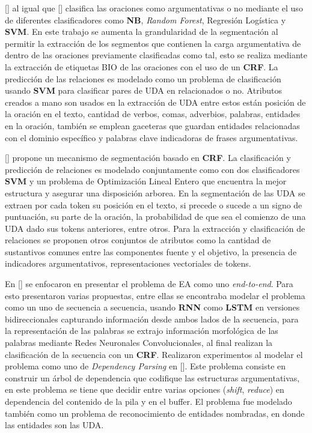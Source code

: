 [\cite{goudas2015argument}] al igual que [\cite{palau2009argumentation}] clasifica las oraciones como
argumentativas o no mediante el uso de diferentes clasificadores como \textbf{NB}, \emph{Random Forest}, Regresión
Logística y \textbf{SVM}. En este trabajo se aumenta la grandularidad de la segmentación al permitir
la extracción de los segmentos que contienen la carga argumentativa de dentro de las oraciones previamente clasificadas
como tal, esto se realiza mediante la extracción de etiquetas BIO de las oraciones con el uso de un 
\textbf{CRF}. La predicción de las relaciones es modelado como un problema de clasificación
usando \textbf{SVM} para clasificar pares de UDA en relacionados o no. Atributos creados a mano 
son usados en la extracción de UDA entre estos están posición de la oración en el texto, cantidad de verbos, comas, adverbios,
palabras, entidades en la oración, también se emplean gaceteras que guardan entidades relacionadas con el dominio 
específico y palabras clave indicadoras de frases argumentativas. 

[\cite{stab2017parsing}] propone un mecanismo de segmentación basado en \textbf{CRF}. La clasificación
y predicción de relaciones es modelado conjuntamente como con dos clasificadores \textbf{SVM} y un problema
de Optimización Lineal Entero que encuentra la mejor estructura y asegurar una disposición arborea. En la segmentación
de las UDA se extraen por cada token su posición en el texto, si precede o sucede a un signo de puntuación, su parte de
la oración, la probabilidad de que sea el comienzo de una UDA dado sus tokens anteriores, entre otros. Para la extracción
y clasificación de relaciones se proponen otros conjuntos de atributos como la cantidad de sustantivos comunes entre
las componentes fuente y el objetivo, la presencia de indicadores argumentativos, representaciones vectoriales de tokens.

En [\cite{eger2017neural}] se enfocaron en presentar el problema de EA como uno \emph{end-to-end}. 
Para esto presentaron varias propuestas, entre ellas se encontraba
modelar el problema como un uno de secuencia a secuencia, usando \textbf{RNN} como 
\textbf{LSTM} en versiones bidireccionales capturando información desde ambos lados de la secuencia,
para la representación de las palabras se extrajo información morfológica de las palabras mediante Redes Neuronales Convolucionales,
al final realizan la clasificación de la secuencia con un \textbf{CRF}. 
Realizaron experimentos al modelar el problema como uno de \emph{Dependency Parsing} en [\cite{kiperwasser2016simple}]. Este problema
consiste en construir un árbol de dependencia que codifique las estructuras argumentativas, en este problema 
se tiene que decidir entre varias opciones (\emph{shift}, \emph{reduce}) en dependencia del contenido de la pila y en el buffer.
El problema fue modelado también como un problema de reconocimiento de entidades nombradas, en donde las entidades son las UDA.

